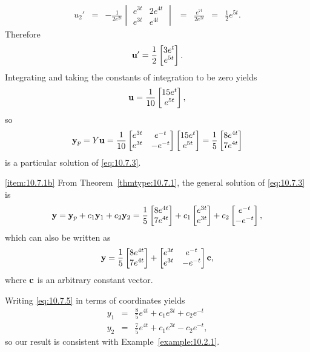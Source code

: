 \documentclass{ximera}
\begin{document}
\begin{example}
\begin{explanation}
$$\begin{array}{ccccccl}
u_2'&=&-\frac{1}{2e^{2t}}
\begin{vmatrix}e^{3t}&2e^{4t}\\e^{3t}&e^{4t}
\end{vmatrix}&=&\frac{e^{7t}}{2e^{2t}}&=&\frac{1}{2}e^{5t}.
\end{array}
$$
 Therefore
$$
{\bf
u}'=\frac{1}{2}\begin{bmatrix}3e^t\\e^{5t}\end{bmatrix}.
$$
Integrating and taking the constants of integration to be zero yields
$$
{\bf
u}=\frac{1}{10}\begin{bmatrix}15e^t\\e^{5t}\end{bmatrix},
$$
so
$$
{\bf y}_p=Y{\bf u}=
\frac{1}{10}\begin{bmatrix}e^{3t}&e^{-t}\\
e^{3t}&-e^{-t}\end{bmatrix}
\begin{bmatrix}15e^t\\e^{5t}\end{bmatrix}
=\frac{1}{5}\begin{bmatrix}8e^{4t}\\7e^{4t}\end{bmatrix}
$$
is a particular solution of  \eqref{eq:10.7.3}.


\ref{item:10.7.1b} From Theorem~\ref{thmtype:10.7.1}, the general solution of
\eqref{eq:10.7.3} is
\begin{equation} \label{eq:10.7.5}
{\bf y}={\bf y}_p+c_1{\bf y}_1+c_2{\bf y}_2=
\frac{1}{5}\begin{bmatrix}8e^{4t}\\7e^{4t}\end{bmatrix}
+c_1\begin{bmatrix}e^{3t}\\e^{3t}\end{bmatrix}
+c_2\begin{bmatrix}e^{-t}\\-e^{-t}\end{bmatrix},
\end{equation}
which can also be written as
$$
{\bf y}=
\frac{1}{5}\begin{bmatrix}8e^{4t}\\7e^{4t}\end{bmatrix}
+\begin{bmatrix}e^{3t}&e^{-t}\\e^{3t}&-e^{-t}\end{bmatrix}{\bf c},
$$
where ${\bf c}$ is an arbitrary constant vector.

Writing \eqref{eq:10.7.5} in terms of
coordinates yields
\begin{eqnarray*}
y_1&=&\frac{8}{5}e^{4t}+c_1e^{3t}+c_2e^{-t}\\
y_2&=&\frac{7}{5}e^{4t}+c_1e^{3t}-c_2e^{-t},
\end{eqnarray*}
so our result is consistent with Example~\ref{example:10.2.1}.
\end{explanation}
\end{example}
\end{document}
